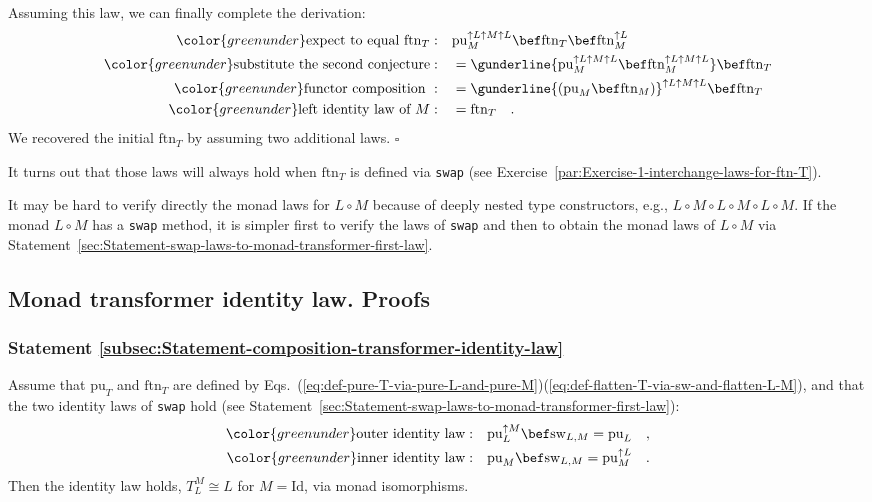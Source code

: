 Assuming this law, we can finally complete the derivation:
\begin{align*}
{\color{greenunder}\text{expect to equal }\text{ftn}_{T}:}\quad & \text{pu}_{M}^{\uparrow L\uparrow M\uparrow L}\bef\text{ftn}_{T}\bef\text{ftn}_{M}^{\uparrow L}\\
{\color{greenunder}\text{substitute the second conjecture}:}\quad & =\gunderline{\text{pu}_{M}^{\uparrow L\uparrow M\uparrow L}\bef\text{ftn}_{M}^{\uparrow L\uparrow M\uparrow L}}\bef\text{ftn}_{T}\\
{\color{greenunder}\text{functor composition }:}\quad & =\gunderline{(\text{pu}_{M}\bef\text{ftn}_{M})}^{\uparrow L\uparrow M\uparrow L}\bef\text{ftn}_{T}\\
{\color{greenunder}\text{left identity law of }M:}\quad & =\text{ftn}_{T}\quad.
\end{align*}
We recovered the initial $\text{ftn}_{T}$ by assuming two additional
laws. $\square$

It turns out that those laws will always hold when $\text{ftn}_{T}$
is defined via \lstinline!swap! (see Exercise~\ref{par:Exercise-1-interchange-laws-for-ftn-T}).

It may be hard to verify directly the monad laws for $L\circ M$ because
of deeply nested type constructors, e.g., $L\circ M\circ L\circ M\circ L\circ M$.
If the monad $L\circ M$ has a \lstinline!swap! method, it is simpler
first to verify the laws of \lstinline!swap! and then to obtain the
monad laws of $L\circ M$ via Statement~\ref{sec:Statement-swap-laws-to-monad-transformer-first-law}.

\subsection{Monad transformer identity law. Proofs}

\subsubsection{Statement \label{subsec:Statement-composition-transformer-identity-law}\ref{subsec:Statement-composition-transformer-identity-law}}

Assume that $\text{pu}_{T}$ and $\text{ftn}_{T}$ are defined by
Eqs.~(\ref{eq:def-pure-T-via-pure-L-and-pure-M})\textendash (\ref{eq:def-flatten-T-via-sw-and-flatten-L-M}),
and that the two identity laws of \lstinline!swap! hold (see Statement~\ref{sec:Statement-swap-laws-to-monad-transformer-first-law}):
\begin{align*}
{\color{greenunder}\text{outer identity law}:}\quad & \text{pu}_{L}^{\uparrow M}\bef\text{sw}_{L,M}=\text{pu}_{L}\quad,\\
{\color{greenunder}\text{inner identity law}:}\quad & \text{pu}_{M}\bef\text{sw}_{L,M}=\text{pu}_{M}^{\uparrow L}\quad.
\end{align*}
Then the identity law holds, $T_{L}^{M}\cong L$ for $M=\text{Id}$,
via monad isomorphisms. 

